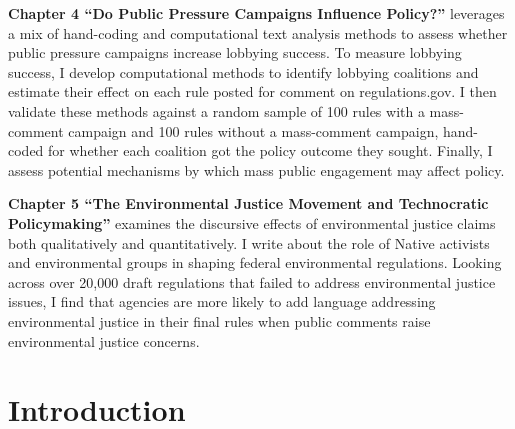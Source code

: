 \documentclass[
      12pt,
        ]{article}
\begin{document}
\textbf{Chapter 4 ``Do Public Pressure Campaigns Influence Policy?''} leverages a mix of hand-coding and computational text analysis methods to assess whether public pressure campaigns increase lobbying success. To measure lobbying success, I develop computational methods to identify lobbying coalitions and estimate their effect on each rule posted for comment on regulations.gov. I then validate these methods against a random sample of 100 rules with a mass-comment campaign and 100 rules without a mass-comment campaign, hand-coded for whether each coalition got the policy outcome they sought. Finally, I assess potential mechanisms by which mass public engagement may affect policy.

\textbf{Chapter 5 ``The Environmental Justice Movement and Technocratic Policymaking''} examines the discursive effects of environmental justice claims both qualitatively and quantitatively. I write about the role of Native activists and environmental groups in shaping federal environmental regulations. Looking across over 20,000 draft regulations that failed to address environmental justice issues, I find that agencies are more likely to add language addressing environmental justice in their final rules when public comments raise environmental justice concerns.

\newpage

\setcounter{page}{1}

\hypertarget{intro}{%
\section{Introduction}\label{intro}}

\onehalfspacing
\end{document}
